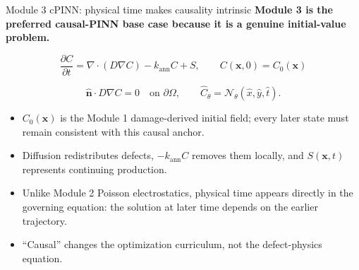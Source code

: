 \documentclass[aspectratio=169,10pt]{beamer}
\begin{document}
\begin{frame}{Module 3 cPINN: physical time makes causality intrinsic}
\small
\textbf{Module 3 is the preferred causal-PINN base case because it is a genuine initial-value problem.}

\vspace{0.2em}
\begin{equation*}
\boxed{
\frac{\partial C}{\partial t}
=
\nabla\cdot(D\nabla C)
-k_{\mathrm{ann}}C
+S,
\qquad
C(\mathbf x,0)=C_0(\mathbf x)
}
\end{equation*}

\vspace{-0.1em}
\begin{equation*}
\hat{\mathbf n}\cdot D\nabla C=0
\quad\text{on }\partial\Omega,
\qquad
\widehat C_{\theta}
=\mathcal N_{\theta}(\hat x,\hat y,\hat t).
\end{equation*}

\vspace{-0.1em}
\begin{itemize}
    \item $C_0(\mathbf x)$ is the Module 1 damage-derived initial field; every later state must remain consistent with this causal anchor.
    \item Diffusion redistributes defects, $-k_{\mathrm{ann}}C$ removes them locally, and $S(\mathbf x,t)$ represents continuing production.
    \item Unlike Module 2 Poisson electrostatics, physical time appears directly in the governing equation: the solution at later time depends on the earlier trajectory.
    \item ``Causal'' changes the optimization curriculum, not the defect-physics equation.
\end{itemize}
\end{frame}
\end{document}
